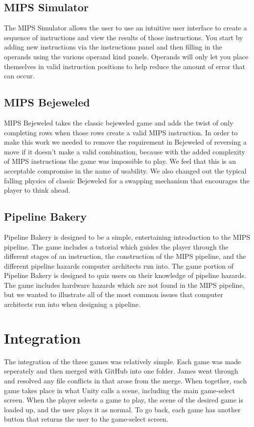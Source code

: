 \documentclass[12pt]{article}
\begin{document}
	\subsection{MIPS Simulator}
	The MIPS Simulator allows the user to use an intuitive user interface to create a sequence of instructions and view the results of those instructions. You start by adding new instructions via the instructions panel and then filling in the operands using the various operand kind panels. Operands will only let you place themselves in valid instruction positions to help reduce the amount of error that can occur.
	\subsection{MIPS Bejeweled}
	MIPS Bejeweled takes the classic bejeweled game and adds the twist of only completing rows when those rows create a valid MIPS instruction. In order to make this work we needed to remove the requirement in Bejeweled of reversing a move if it doesn't make a valid combination, because with the added complexity of MIPS instructions the game was impossible to play. We feel that this is an acceptable compromise in the name of usability. We also changed out the typical falling physics of classic Bejeweled for a swapping mechanism that encourages the player to think ahead.
	\subsection{Pipeline Bakery}
	Pipeline Bakery is designed to be a simple, entertaining introduction to the MIPS pipeline. The game includes a tutorial which guides the player through the different stages of an instruction, the construction of the MIPS pipeline, and the different pipeline hazards computer architects run into. The game portion of Pipeline Bakery is designed to quiz users on their knowledge of pipeline hazards. The game includes hardware hazards which are not found in the MIPS pipeline, but we wanted to illustrate all of the most common issues that computer architects run into when designing a pipeline. 
	\section{Integration}
	The integration of the three games was relatively simple. Each game was made seperately and then merged with GitHub into one folder. James went through and resolved any file conflicts in that arose from the merge. When together, each game takes place in what Unity calls a scene, including the main game-select screen. When the player selects a game to play, the scene of the desired game is loaded up, and the user plays it as normal. To go back, each game has another button that returns the user to the game-select screen.
\end{document}
